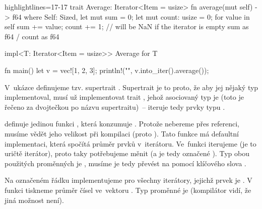 \documentclass[main.tex]{subfiles}
\begin{document}
\obrazek
\begin{rustcode*}{highlightlines={17-17}}
    trait Average: Iterator<Item = usize> {
        fn average(mut self) -> f64
        where
            Self: Sized,
        {
            let mut sum = 0;
            let mut count: usize = 0;
            for value in self {
                sum += value;
                count += 1;
            }
            // will be NaN if the iterator is empty
            sum as f64 / count as f64
        }
    }

    impl<T: Iterator<Item = usize>> Average for T {}

    fn main() {
        let v = vec![1, 2, 3];
        println!("{}", v.into_iter().average());
    }
\end{rustcode*}

V~ukázce definujeme tzv. supertrait . Supertrait je to proto, že aby jej
nějaký typ implementoval, musí už implementovat trait , jehož asociovaný
typ  je  (toto je řečeno za dvojtečkou po názvu supertraitu)~--
iteruje tedy prvky typu .

 definuje jedinou funkci , která konzumuje .
Protože nebereme  přes referenci, musíme vědět jeho velikost při kompilaci
(proto ). Tato funkce má defaultní implementaci, která spočítá průměr prvků
v~iterátoru. Ve~funkci iterujeme  (je to uričtě iterátor), proto taky
potřebujeme  měnit (a je tedy označené ). Typ obou použitých
proměnných je , musíme je tedy převést na  pomocí klíčového slova
.

Na označeném řádku implementujeme  pro všechny iterátory, jejichž prvek je
. V~ funkci tiskneme průměr čísel ve~vektoru . Typ
proměnné  je  (kompilátor vidí, že jiná možnost není).
\end{document}
